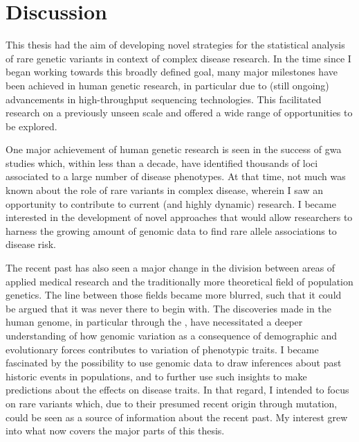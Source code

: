 
\glsresetall




{
\singlespacing
\chapter{Discussion}
\label{ch:discussion}
\minitoc
}




This thesis had the aim of developing novel strategies for the statistical analysis of rare genetic variants in context of complex disease research.
In the time since I began working towards this broadly defined goal, many major milestones have been achieved in human genetic research, in particular due to (still ongoing) advancements in high-throughput sequencing technologies.
This facilitated research on a previously unseen scale and offered a wide range of opportunities to be explored.

One major achievement of human genetic research is seen in the success of \gls{gwa} studies which, within less than a decade, have identified thousands of loci associated to a large number of disease phenotypes.
At that time, not much was known about the role of rare variants in complex disease, wherein I saw an opportunity to contribute to current (and highly dynamic) research.
I became interested in the development of novel approaches that would allow researchers to harness the growing amount of genomic data to find rare allele associations to disease risk.

The recent past has also seen a major change in the division between areas of applied medical research and the traditionally more theoretical field of population genetics.
The line between those fields became more blurred, such that it could be argued that it was never there to begin with.
The discoveries made in the human genome, in particular through the  \citep{IntHumGenSeqCon:2001hk,IntHumGenSeqCon:2004bm}, have necessitated a deeper understanding of how genomic variation as a consequence of demographic and evolutionary forces contributes to variation of phenotypic traits.
I became fascinated by the possibility to use genomic data to draw inferences about past historic events in populations, and to further use such insights to make predictions about the effects on disease traits.
In that regard, I intended to focus on rare variants which, due to their presumed recent origin through mutation, could be seen as a source of information about the recent past.
My interest grew into what now covers the major parts of this thesis.






